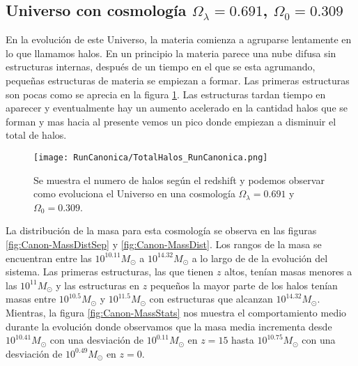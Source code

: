 \subsection{Universo con cosmología  \texorpdfstring{$\Omega_\lambda = 0.691$, $\Omega_0 = 0.309$ }{Omega lambda = 0.691, Omega 0 = 0.309}  }

 En la evolución de este Universo, la materia comienza a agruparse lentamente en lo que llamamos halos. En un principio la materia parece una nube difusa sin estructuras internas, después de un tiempo en el que se esta agrumando, pequeñas estructuras de materia se empiezan a formar. Las primeras estructuras son pocas como se aprecia en la figura \ref{fig:Canon_TotalHalos}. Las estructuras tardan tiempo en aparecer y eventualmente hay un aumento acelerado en la cantidad halos que se forman y mas hacia al presente vemos un pico donde empiezan a disminuir el total de halos.

\begin{figure}[H]
    \centering
    \texttt{[image: RunCanonica/TotalHalos\_RunCanonica.png]}
    \caption[Evolución del número de halos en un Universo $\Omega_\lambda = 0.691 $, $\Omega_0 = 0.309$]{\footnotesize Se muestra el numero de halos según el redshift y podemos observar como evoluciona el Universo en una cosmología $\Omega_\lambda = 0.691 $ y $\Omega_0 = 0.309$.}
    \label{fig:Canon_TotalHalos}
\end{figure}

La distribución de la masa para esta cosmología se observa en las figuras \ref{fig:Canon-MassDistSep} y \ref{fig:Canon-MassDist}. Los rangos de la masa se encuentran entre las $10^{10.11}M_\odot$ a $10^{14.32}M_\odot$ a lo largo de de la evolución del sistema. Las primeras estructuras, las que tienen $z$ altos, tenían masas menores a las $10^{11}M_\odot$ y las estructuras en $z$ pequeños la mayor parte de los halos tenían masas entre $10^{10.5}M_\odot$ y $10^{11.5}M_\odot$ con estructuras que alcanzan $10^{14.32}M_\odot$. Mientras, la figura \ref{fig:Canon-MassStats} nos muestra el comportamiento medio durante la evolución donde observamos que la masa media incrementa desde $10^{10.41}M_\odot$ con una desviación de $10^{0.11}M_\odot$ en $z=15$ hasta $10^{10.75}M_\odot$ con una desviación de $10^{0.49}M_\odot$ en $z=0$.


